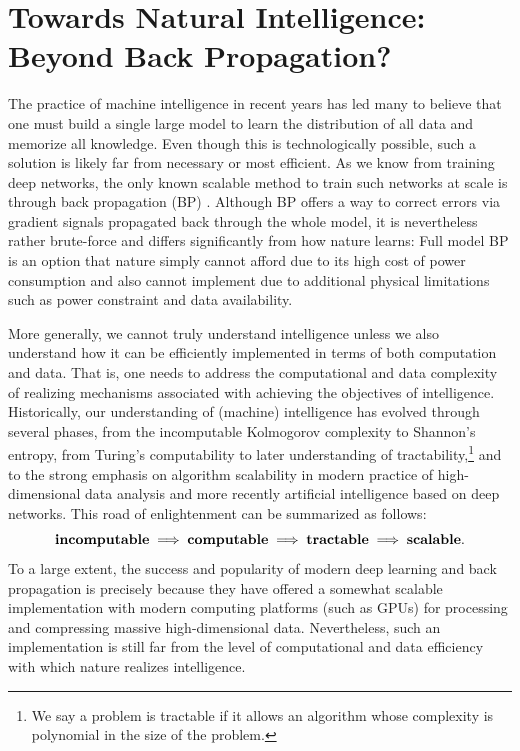 \documentclass[../../book-main.tex]{subfiles}
\begin{document}
\section{Towards Natural Intelligence: Beyond Back Propagation?}
The practice of machine intelligence in recent years has led many to
believe that one must build a single large model to learn the
distribution of all data and memorize all knowledge. Even though this
is technologically possible, such a solution is likely far from
necessary or most efficient. As we know from training deep networks, the
only known scalable method to train such networks at scale is through
back propagation (BP) \citep{Back-Prop}. Although BP offers a way to
correct errors via gradient signals propagated back through the whole
model, it is nevertheless rather brute-force and differs
significantly from how nature learns: Full model BP is an option that nature
simply cannot afford due to its high cost of power consumption 
and also cannot implement due to additional physical limitations such as 
power constraint and data availability.

More generally, we cannot truly understand intelligence unless we
also understand how it can be efficiently implemented in terms of both
 computation and data. That is, one needs to address the computational 
and data complexity of realizing mechanisms
associated with achieving the objectives of intelligence.
Historically, our understanding of (machine) intelligence has evolved
through several phases, from the incomputable Kolmogorov complexity
to Shannon's entropy, from Turing's computability to later
understanding of tractability,\footnote{We say a problem is tractable
    if it allows an algorithm whose complexity is polynomial in the size
of the problem.} and to the strong emphasis on algorithm scalability
in modern practice of high-dimensional data analysis
\citep{Wright-Ma-2022} and more recently artificial intelligence 
based on deep networks. This road of enlightenment can be summarized as follows:
\begin{equation}
    \text{\textbf{incomputable}} \;
    \Longrightarrow \; \text{\textbf{computable}} \;
    \Longrightarrow \; \text{\textbf{tractable}} \; \Longrightarrow \;
    \text{\textbf{scalable}}.
\end{equation}
To a large extent, the success and popularity of modern deep learning and
back propagation is precisely because they have offered a somewhat scalable
implementation with modern computing platforms (such as GPUs) for
processing and compressing massive high-dimensional data. 
Nevertheless, such an implementation is still far from the level of
computational and data efficiency with which nature realizes intelligence.
\end{document}
